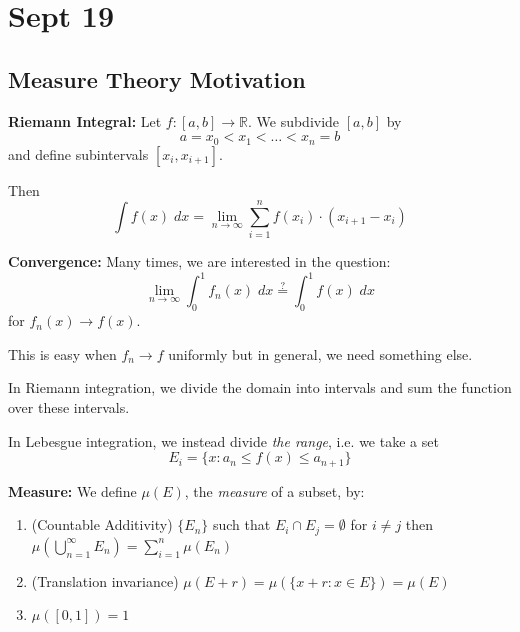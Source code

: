 \documentclass[12pt]{report}
\newcommand{\R}{\mathbb{R}}
\begin{document}
\section{Sept 19}
    \subsection*{Measure Theory Motivation}
        \textbf{Riemann Integral:} Let $f: [a, b] \to \R$. We subdivide $[a, b]$ by 
        \[a = x_0 < x_1 < \dots < x_n = b\]
        and define subintervals $[x_i, x_{i+1}]$. 

        Then 
        \[\int f(x) \;dx = \lim_{n \to \infty}\sum_{i = 1}^{n} f(x_i)\cdot (x_{i+1} - x_i)\]

        \textbf{Convergence:} Many times, we are interested in the question: 
        \[\lim_{n \to \infty} \int_0^1 f_n(x)\; dx \overset{?}{=} \int_0^1 f(x)\; dx\]
        for $f_n(x) \to f(x)$. 

        This is easy when $f_n \to f$ uniformly but in general, we need something else. 

        In Riemann integration, we divide the domain into intervals and sum the function over these intervals.

        In Lebesgue integration, we instead divide \emph{the range}, i.e. we take a set 
        \[E_i = \{x: a_n \leq f(x)\leq a_{n+1}\}\] 

        \textbf{Measure:} We define $\mu(E)$, the \emph{measure} of a subset, by:
        \begin{enumerate}
            \item (Countable Additivity) $\{E_n\}$ such that $E_i \cap E_j = \emptyset$ for $i \neq j$ then $\mu(\bigcup_{n=1}^{\infty} E_n) = \sum_{i=1}^n \mu(E_n)$
            \item (Translation invariance) $\mu(E + r) = \mu(\{x + r: x \in E\})= \mu(E)$
            \item $\mu([0,1]) = 1$
        \end{enumerate} 
\end{document}

